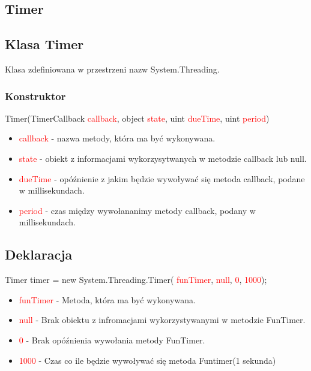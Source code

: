\documentclass{article}
\begin{document}
\subsection{Timer}
\subsection{Klasa Timer}
Klasa zdefiniowana w przestrzeni nazw System.Threading.
\subsubsection{Konstruktor}
Timer(TimerCallback \textcolor{red}{callback}, object \textcolor{red}{state}, uint \textcolor{red}{dueTime}, uint \textcolor{red}{period})
\begin{itemize}
\item \textcolor{red}{callback} - nazwa metody, która ma być wykonywana.
\item \textcolor{red}{state} - obiekt z informacjami wykorzysytwanych w metodzie callback lub null.
\item \textcolor{red}{dueTime} - opóźnienie z jakim będzie wywoływać się metoda callback, podane w millisekundach.
\item \textcolor{red}{period} - czas między wywołananimy metody callback, podany w millisekundach.
\end{itemize}
\subsection{Deklaracja}
Timer timer = new System.Threading.Timer(\space \textcolor{red}{ funTimer},\space \textcolor{red}{ null},\space \textcolor{red}{ 0},\space \textcolor{red}{ 1000});
\begin{itemize}
\item \textcolor{red}{funTimer} - Metoda, która ma być wykonywana.
\item \textcolor{red}{null} - Brak obiektu z infromacjami wykorzystywanymi w metodzie FunTimer.
\item \textcolor{red}{0} - Brak opóźnienia wywołania metody FunTimer.
\item \textcolor{red}{1000} - Czas co ile będzie wywoływać się metoda Funtimer(1 sekunda)
\end{itemize}
\end{document}
